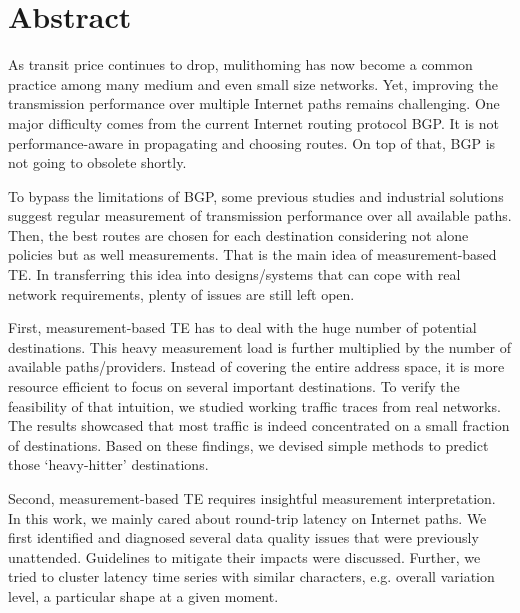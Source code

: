 \begingroup
\let\clearpage\relax
\let\cleardoublepage\relax
\let\cleardoublepage\relax

\chapter*{Abstract}
As transit price continues to drop, mulithoming has now become a common practice among many medium and even small size networks. Yet, improving the transmission performance over multiple Internet paths remains challenging.
One major difficulty comes from the current Internet routing protocol \acf{BGP}.
It is not performance-aware in propagating and choosing routes. 
On top of that, \ac{BGP} is not going to obsolete shortly.

To bypass the limitations of \ac{BGP}, some previous studies and industrial solutions suggest regular measurement of transmission performance over all available paths.
Then, the best routes are chosen for each destination considering not alone policies but as well measurements. That is the main idea of measurement-based \acf{TE}.
In transferring this idea into designs/systems that can cope with real network requirements, plenty of  issues are still left open.

First, measurement-based TE has to deal with the huge number of potential destinations.
This heavy measurement load is further multiplied by the number of available paths/providers.
Instead of covering the entire address space, it is more resource efficient to focus on several important destinations.
To verify the feasibility of that intuition, we studied working traffic traces from real networks.
The results showcased that most traffic is indeed concentrated on a small fraction of destinations.
Based on these findings, we devised simple methods to predict those `heavy-hitter' destinations.

Second, measurement-based TE requires insightful measurement interpretation.
In this work, we mainly cared about round-trip latency on Internet paths.
We first identified and diagnosed several data quality issues that were previously unattended.
Guidelines to mitigate their impacts were discussed.
Further, we tried to cluster latency time series with similar characters, e.g. overall variation level, a particular shape at a given moment.

